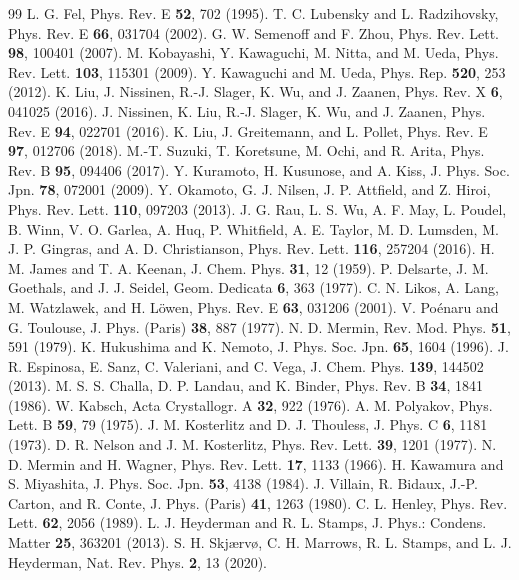\documentclass[pre,twocolumn,superscriptaddress,amsmath,amssymb,floatfix]{revtex4-2}
\begin{document}
\begin{thebibliography}{99}
 L. G. Fel, Phys. Rev. E \textbf{52}, 702 (1995).
 T. C. Lubensky and L. Radzihovsky, Phys. Rev. E \textbf{66}, 031704 (2002).
 G. W. Semenoff and F. Zhou, Phys. Rev. Lett. \textbf{98}, 100401 (2007).
 M. Kobayashi, Y. Kawaguchi, M. Nitta, and M. Ueda, Phys. Rev. Lett. \textbf{103}, 115301 (2009).
 Y. Kawaguchi and M. Ueda, Phys. Rep. \textbf{520}, 253 (2012).
 K. Liu, J. Nissinen, R.-J. Slager, K. Wu, and J. Zaanen, Phys. Rev. X \textbf{6}, 041025 (2016).
 J. Nissinen, K. Liu, R.-J. Slager, K. Wu, and J. Zaanen, Phys. Rev. E \textbf{94}, 022701 (2016).
 K. Liu, J. Greitemann, and L. Pollet, Phys. Rev. E \textbf{97}, 012706 (2018).
 M.-T. Suzuki, T. Koretsune, M. Ochi, and R. Arita, Phys. Rev. B \textbf{95}, 094406 (2017).
 Y. Kuramoto, H. Kusunose, and A. Kiss, J. Phys. Soc. Jpn. \textbf{78}, 072001 (2009).
 Y. Okamoto, G. J. Nilsen, J. P. Attfield, and Z. Hiroi, Phys. Rev. Lett. \textbf{110}, 097203 (2013).
 J. G. Rau, L. S. Wu, A. F. May, L. Poudel, B. Winn, V. O. Garlea, A. Huq, P. Whitfield, A. E. Taylor, M. D. Lumsden, M. J. P. Gingras, and A. D. Christianson, Phys. Rev. Lett. \textbf{116}, 257204 (2016).
 H. M. James and T. A. Keenan, J. Chem. Phys. \textbf{31}, 12 (1959).
 P. Delsarte, J. M. Goethals, and J. J. Seidel, Geom. Dedicata \textbf{6}, 363 (1977).
 C. N. Likos, A. Lang, M. Watzlawek, and H. L\"owen, Phys. Rev. E \textbf{63}, 031206 (2001).
 V. Po\'enaru and G. Toulouse, J. Phys. (Paris) \textbf{38}, 887 (1977).
 N. D. Mermin, Rev. Mod. Phys. \textbf{51}, 591 (1979).
 K. Hukushima and K. Nemoto, J. Phys. Soc. Jpn. \textbf{65}, 1604 (1996).
 J. R. Espinosa, E. Sanz, C. Valeriani, and C. Vega, J. Chem. Phys. \textbf{139}, 144502 (2013).
 M. S. S. Challa, D. P. Landau, and K. Binder, Phys. Rev. B \textbf{34}, 1841 (1986).
 W. Kabsch, Acta Crystallogr. A \textbf{32}, 922 (1976).
 A. M. Polyakov, Phys. Lett. B \textbf{59}, 79 (1975).
 J. M. Kosterlitz and D. J. Thouless, J. Phys. C \textbf{6}, 1181 (1973).
 D. R. Nelson and J. M. Kosterlitz, Phys. Rev. Lett. \textbf{39}, 1201 (1977).
 N. D. Mermin and H. Wagner, Phys. Rev. Lett. \textbf{17}, 1133 (1966).
 H. Kawamura and S. Miyashita, J. Phys. Soc. Jpn. \textbf{53}, 4138 (1984).
 J. Villain, R. Bidaux, J.-P. Carton, and R. Conte, J. Phys. (Paris) \textbf{41}, 1263 (1980).
 C. L. Henley, Phys. Rev. Lett. \textbf{62}, 2056 (1989).
 L. J. Heyderman and R. L. Stamps, J. Phys.: Condens. Matter \textbf{25}, 363201 (2013).
 S. H. Skj{\ae}rv{\o}, C. H. Marrows, R. L. Stamps, and L. J. Heyderman, Nat. Rev. Phys. \textbf{2}, 13 (2020).
\end{thebibliography}
\end{document}
